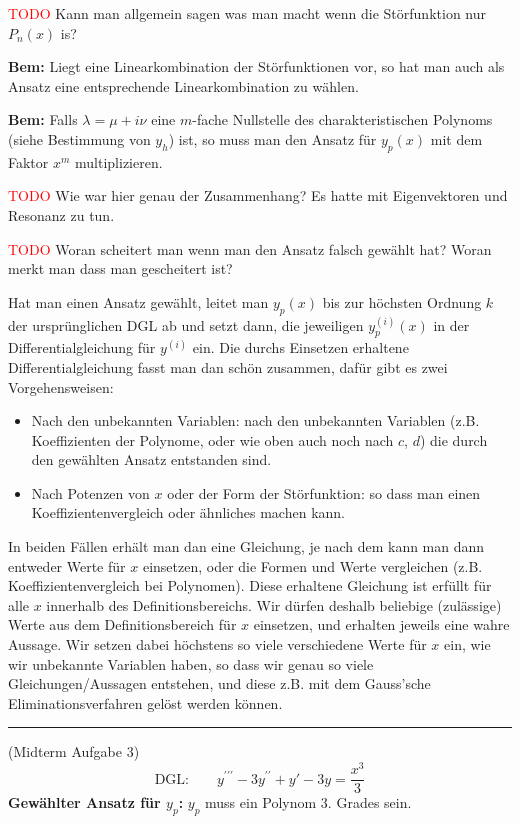 \documentclass[a4paper,landscape,8pt]{extarticle}
\newcommand{\todo}{\textcolor{red}{TODO }}
\newcommand{\sep}{\vspace{5pt}\noindent\hrule\vspace{5pt}}
\newcommand{\Bem}{\textbf{Bem: }}
\begin{document}
\begin{multicols*}{4}
\begin{warmup}
\begin{warmup}
\todo Kann man allgemein sagen was man macht wenn die Störfunktion nur $P_n(x)$
is?

\Bem Liegt eine Linearkombination der Störfunktionen vor, so hat man auch als
Ansatz eine entsprechende Linearkombination zu wählen.

\Bem Falls $\lambda=\mu + i\nu$ eine $m$-fache Nullstelle des charakteristischen
Polynoms (siehe Bestimmung von $y_h$) ist, so muss man den Ansatz für $y_p(x)$
mit dem Faktor $x^m$ multiplizieren. 

\todo Wie war hier genau der Zusammenhang? Es hatte mit Eigenvektoren und
Resonanz zu tun.

\todo Woran scheitert man wenn man den Ansatz falsch gewählt hat? Woran merkt
man dass man gescheitert ist?

Hat man einen Ansatz gewählt, leitet man $y_p(x)$ bis zur höchsten Ordnung $k$
der ursprünglichen DGL ab und setzt dann, die jeweiligen $y^{(i)}_p(x)$ in der
Differentialgleichung für $y^{(i)}$ ein. Die durchs Einsetzen erhaltene
Differentialgleichung fasst man dan schön zusammen, dafür gibt es zwei
Vorgehensweisen:
\begin{itemize}
  \item Nach den unbekannten Variablen: nach den unbekannten Variablen (z.B.
  Koeffizienten der Polynome, oder wie oben auch noch nach $c$, $d$) die durch
   den gewählten Ansatz entstanden
sind.
\item Nach Potenzen von $x$ oder der Form der Störfunktion: so dass man einen
 Koeffizientenvergleich oder ähnliches machen kann.
\end{itemize}

In beiden Fällen erhält man dan eine Gleichung, je nach dem kann man dann
entweder Werte für $x$ einsetzen, oder die Formen und Werte vergleichen (z.B.
Koeffizientenvergleich bei Polynomen). Diese erhaltene Gleichung ist erfüllt für
alle $x$ innerhalb des Definitionsbereichs. Wir dürfen deshalb beliebige
(zulässige) Werte aus dem Definitionsbereich für $x$ einsetzen, und erhalten
jeweils eine wahre Aussage. Wir setzen dabei höchstens so viele verschiedene
Werte für $x$ ein, wie wir unbekannte Variablen haben, so dass wir genau so
viele Gleichungen/Aussagen entstehen, und diese z.B. mit dem Gauss'sche
Eliminationsverfahren gelöst werden können.

\sep

\Bsp (Midterm Aufgabe 3)
\[
\text{DGL:} \qquad y^{\prime\prime\prime}-3y^{\prime\prime}+y'-3y = \frac{x^3}{3}
\]
\textbf{Gewählter Ansatz für $y_p$:} $y_p$ muss ein Polynom 3. Grades sein.


\end{warmup}
\end{warmup}
\end{multicols*}
\end{document}
